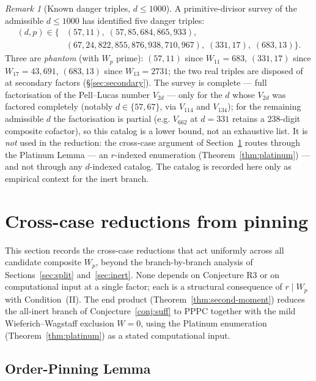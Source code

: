 \documentclass[11pt]{amsart}
\theoremstyle{plain}
\theoremstyle{definition}
\theoremstyle{remark}
\newtheorem{remark}[theorem]{Remark}
\numberwithin{equation}{section}
\begin{document}
\begin{remark}[Known danger triples, $d \leq 1000$]\label{rem:known-danger}
A primitive-divisor survey of the admissible $d \leq 1000$ has identified five danger triples:
\[
  \begin{aligned}
  (d, p) \in \{& (57, 11),\; (57, 85{,}684{,}865{,}933),\\
               & (67, 24{,}822{,}855{,}876{,}938{,}710{,}967),\; (331, 17),\; (683, 13)\}.
  \end{aligned}
\]
Three are \emph{phantom} (with $W_p$ prime): $(57, 11)$ since $W_{11} = 683$, $(331, 17)$ since $W_{17} = 43{,}691$, $(683, 13)$ since $W_{13} = 2731$; the two real triples are disposed of at secondary factors (\S\ref{sec:secondary}). The survey is complete --- full factorisation of the Pell--Lucas number $V_{2d}$ --- only for the $d$ whose $V_{2d}$ was factored completely (notably $d \in \{57, 67\}$, via $V_{114}$ and $V_{134}$); for the remaining admissible $d$ the factorisation is partial (e.g. $V_{662}$ at $d = 331$ retains a 238-digit composite cofactor), so this catalog is a lower bound, not an exhaustive list. It is \emph{not} used in the reduction: the cross-case argument of Section~\ref{sec:cross-case} routes through the Platinum Lemma --- an $r$-indexed enumeration (Theorem~\ref{thm:platinum}) --- and not through any $d$-indexed catalog. The catalog is recorded here only as empirical context for the inert branch.
\end{remark}

\section{Cross-case reductions from pinning}\label{sec:cross-case}

This section records the cross-case reductions that act uniformly across all candidate composite $W_p$, beyond the branch-by-branch analysis of Sections~\ref{sec:split} and~\ref{sec:inert}. None depends on Conjecture R3 or on computational input at a single factor; each is a structural consequence of $r \mid W_p$ with Condition~(II). The end product (Theorem~\ref{thm:second-moment}) reduces the all-inert branch of Conjecture~\ref{conj:suff} to PPPC together with the mild Wieferich--Wagstaff exclusion $W = 0$, using the Platinum enumeration (Theorem~\ref{thm:platinum}) as a stated computational input.

\subsection{Order-Pinning Lemma}
\end{document}
